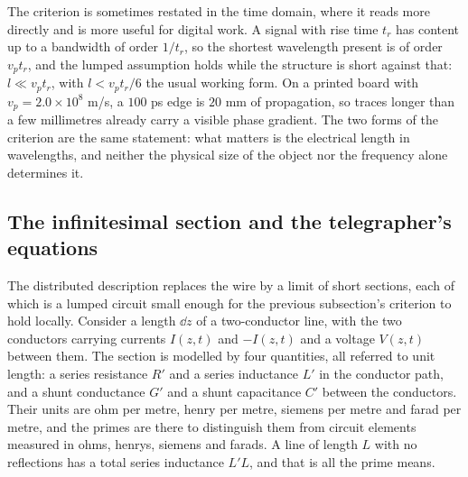 The criterion is sometimes restated in the time domain, where it reads more directly and is more useful for
digital work. A signal with rise time $t_r$ has content up to a bandwidth of order $1/t_r$, so the shortest
wavelength present is of order $v_p t_r$, and the lumped assumption holds while the structure is short against
that: $l \ll v_p t_r$, with $l < v_p t_r/6$ the usual working form. On a printed board with
$v_p = 2.0\times10^{8}$ m/s, a $100$ ps edge is $20$ mm of propagation, so traces longer than a few millimetres
already carry a visible phase gradient. The two forms of the criterion are the same statement: what matters is
the electrical length in wavelengths, and neither the physical size of the object nor the frequency alone
determines it.

\subsection{The infinitesimal section and the telegrapher's equations}
\label{sec:tline-telegrapher}

The distributed description replaces the wire by a limit of short sections, each of which is a lumped circuit
small enough for the previous subsection's criterion to hold locally. Consider a length $\dd z$ of a
two-conductor line, with the two conductors carrying currents $I(z,t)$ and $-I(z,t)$ and a voltage $V(z,t)$
between them. The section is modelled by four quantities, all referred to unit length: a series resistance
$R'$ and a series inductance $L'$ in the conductor path, and a shunt conductance $G'$ and a shunt capacitance
$C'$ between the conductors. Their units are ohm per metre, henry per metre, siemens per metre and farad per
metre, and the primes are there to distinguish them from circuit elements measured in ohms, henrys, siemens and
farads. A line of length $L$ with no reflections has a total series inductance $L' L$, and that is all the
prime means.

